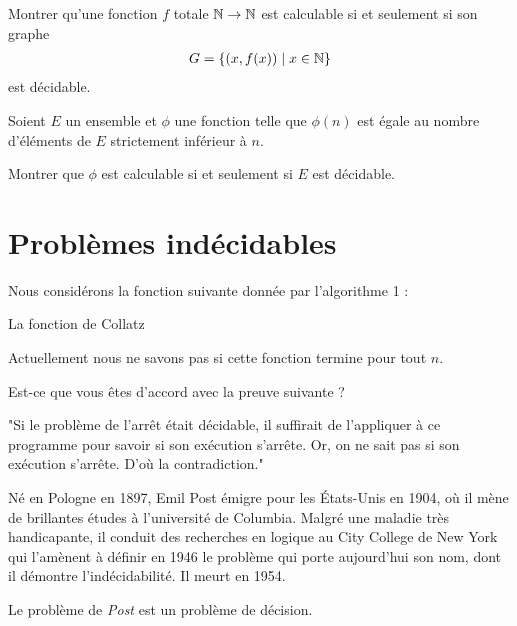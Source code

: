 \documentclass[french,a4paper,10pt]{article}
\begin{document}
	\begin{td-exo}[]
		Montrer qu'une fonction $f$ totale $\mathbb{N}\to\mathbb{N}$ est calculable si et seulement si son graphe 
			\[\begin{aligned}
				G=\{(x,f(x))\mid x\in\mathbb{N}\}
			\end{aligned}\]
		est décidable.
		
	\end{td-exo}
	
	\begin{td-exo}[]
		Soient $E$ un ensemble et $\phi$ une fonction telle que $\phi(n)$ est égale au nombre d'éléments de $E$ strictement inférieur à $n$.
		
		Montrer que $\phi$ est calculable si et seulement si $E$ est décidable.
		
	\end{td-exo}
	
	\section{Problèmes indécidables}
	
	\begin{td-exo}[]
		Nous considérons la fonction suivante donnée par l'algorithme 1 :\\
		\begin{algorithm}[H]
			\caption{La fonction de Collatz}
			\SetAlgoLined
		\end{algorithm}
		Actuellement nous ne savons pas si cette fonction termine pour tout $n$.
		
		Est-ce que vous êtes d'accord avec la preuve suivante ?
		\begin{center}
			"Si le problème de l'arrêt était décidable, il suffirait de l'appliquer à ce programme pour savoir si son exécution s'arrête. Or, on ne sait pas si son exécution s'arrête. D'où la contradiction."
		\end{center}
	\end{td-exo}
	
	\begin{td-exo}[]
		Né en Pologne en 1897, Emil Post émigre pour les États-Unis en 1904, où il mène de brillantes études à l'université de Columbia.
		Malgré une maladie très handicapante, il conduit des recherches en logique au City College de New York qui l'amènent à définir en 1946 le problème qui porte aujourd'hui son nom, dont il démontre l'indécidabilité.
		Il meurt en 1954.
		
		Le problème de \emph{Post} est un problème de décision.
		
	\end{td-exo}
\end{document}

